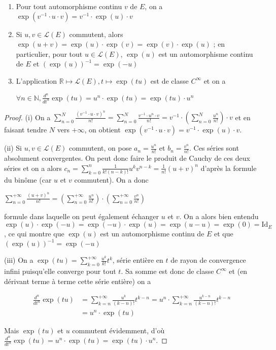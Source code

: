 \begin{prop}
\begin{enumerate}
\item Pour tout automorphisme continu $v$ de $E$, on a $\exp(v^{-1} \cdot u \cdot v) = v^{-1} \cdot \exp(u) \cdot v$
\item Si $u,v \in \mathcal{L}(E)$ commutent, alors $\exp(u + v) = \exp(u) \cdot \exp(v) = \exp(v) \cdot \exp(u)$ ; en particulier, pour tout $u \in \mathcal{L}(E)$, $\exp(u)$ est un automorphisme continu de $E$ et $(\exp(u))^{-1} = \exp(-u)$
\item L'application $\mathbb{R} \mapsto \mathcal{L}(E), t \mapsto \exp(tu)$ est de classe $C^{\infty}$ et on a

$\forall n \in \mathbb{N}, \frac{d^n}{dt^n} \exp(tu) = u^n \cdot \exp(tu) = \exp(tu) \cdot u^n$
\end{enumerate}
\end{prop}

\begin{proof}
(i) On a $\sum_{n=0}^N \frac{(v^{-1} \cdot u \cdot v)^n}{n!} = \sum_{n=0}^N \frac{v^{-1} \cdot u^n \cdot v}{n!} = v^{-1} \cdot \left(\sum_{n=0}^N \frac{u^n}{n!}\right) \cdot v$ et en faisant tendre $N$ vers $+\infty$, on obtient $\exp(v^{-1} \cdot u \cdot v) = v^{-1} \cdot \exp(u) \cdot v$.

(ii) Si $u,v \in \mathcal{L}(E)$ commutent, on pose $a_n = \frac{u^n}{n!}$ et $b_n = \frac{v^n}{n!}$. Ces séries sont absolument convergentes. On peut donc faire le produit de Cauchy de ces deux séries et on a alors $c_n = \sum_{k=0}^n \frac{1}{k!(n-k)!} u^k v^{n-k} = \frac{1}{n!}(u+v)^n$ d'après la formule du binôme (car $u$ et $v$ commutent). On a donc

$\sum_{n=0}^{+\infty} \frac{(u+v)^n}{n!} = \left(\sum_{n=0}^{+\infty} \frac{u^n}{n!}\right) \cdot \left(\sum_{n=0}^{+\infty} \frac{v^n}{n!}\right)$

formule dans laquelle on peut également échanger $u$ et $v$. On a alors bien entendu $\exp(u) \cdot \exp(-u) = \exp(-u) \cdot \exp(u) = \exp(u-u) = \exp(0) = \mathrm{Id}_E$, ce qui montre que $\exp(u)$ est un automorphisme continu de $E$ et que $(\exp(u))^{-1} = \exp(-u)$

(iii) On a $\exp(tu) = \sum_{k=0}^{+\infty} \frac{u^k}{k!} t^k$, série entière en $t$ de rayon de convergence infini puisqu'elle converge pour tout $t$. Sa somme est donc de classe $C^{\infty}$ et (en dérivant terme à terme cette série entière) on a

\begin{align*}
\frac{d^n}{dt^n} \exp(tu) &= \sum_{k=n}^{+\infty} \frac{u^k}{(k-n)!} t^{k-n} = u^n \cdot \sum_{k=n}^{+\infty} \frac{u^{k-n}}{(k-n)!} t^{k-n} \\
&= u^n \cdot \exp(tu)
\end{align*}

Mais $\exp(tu)$ et $u$ commutent évidemment, d'où $\frac{d^n}{dt^n} \exp(tu) = u^n \cdot \exp(tu) = \exp(tu) \cdot u^n$.
\end{proof}

